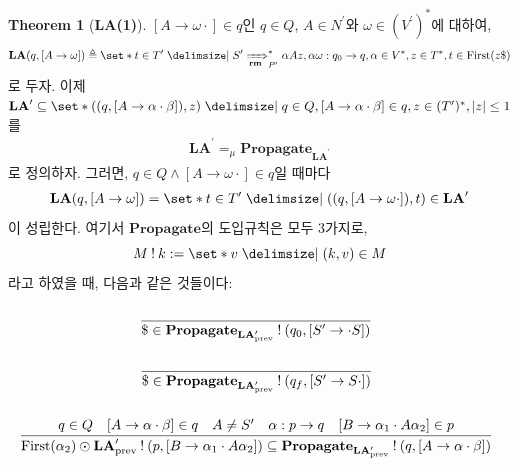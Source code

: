 \documentclass[12pt]{paper}
\theoremstyle{definition}
\newtheorem*{theorem}{Theorem}
\begin{document}
\begin{theorem}[\textbf{LA(1)}]
$ [ A \to \omega \cdot ] \in q $인 $q \in Q$, $A \in N^\prime$와 $\omega \in ( V^\prime )^\ast$에 대하여,
\begin{align}
\mathbf{LA} ( q , [ A \to \omega ] ) \triangleq \set*{ t \in T^\prime \mid S^\prime \xRightarrow[\mathbf{rm}]{}_{P^\prime}^\ast \alpha A z , \alpha \omega : q_0 \to q , \alpha \in V^\ast , z \in T^\ast , t \in \mathrm{First} ( z \$ ) }
\end{align}
로 두자. 이제 $\mathbf{LA}^\prime \subseteq \set*{ ( ( q , [ A \to \alpha \cdot \beta ] ) , z ) \mid q \in Q , [ A \to \alpha \cdot \beta ] \in q , z \in ( T^\prime )^\ast , \left| z \right| \le 1 } $를
\begin{align*}
\mathbf{LA}^\prime =_\mu \textbf{Propagate}_{\mathbf{LA}^\prime}
\end{align*}
로 정의하자.
그러면, $q \in Q \land [ A \to \omega \cdot ] \in q$일 때마다
\begin{align}
\mathbf{LA} ( q , [ A \to \omega ] ) = \set*{ t \in T^\prime \mid ( ( q , [ A \to \omega \cdot ] ) , t ) \in \mathbf{LA}^\prime }
\end{align}
이 성립한다.
여기서 $\textbf{Propagate}$의 도입규칙은 모두 3가지로, $$M \mathbin{!} k := \set*{ v \mid ( k , v ) \in M }$$라고 하였을 때, 다음과 같은 것들이다:
\begin{equation}
\begin{matrix}\\ \infer[]{\$ \in \textbf{Propagate}_{\mathbf{LA}^\prime_\mathrm{prev}} \mathbin{!} ( q_0 , [ S^\prime \to \cdot S ] )}{}\end{matrix}
\end{equation}
\begin{equation}
\begin{matrix}\\ \infer[]{\$ \in \textbf{Propagate}_{\mathbf{LA}^\prime_\mathrm{prev}} \mathbin{!} ( q_f , [ S^\prime \to S \cdot ] )}{}\end{matrix}
\end{equation}
\begin{equation}
\begin{matrix}\\ \infer[]{\mathrm{First} ( \alpha_2 ) \odot \mathbf{LA}^\prime_\mathrm{prev} \mathbin{!} ( p , [ B \to \alpha_1 \cdot A \alpha_2 ] ) \subseteq \textbf{Propagate}_{\mathbf{LA}^\prime_\mathrm{prev}} \mathbin{!} ( q , [ A \to \alpha \cdot \beta ])}{q \in Q & [ A \to \alpha \cdot \beta ] \in q & A \ne S^\prime & \alpha : p \to q & [ B \to \alpha_1 \cdot A \alpha_2] \in p}\end{matrix}
\end{equation}
\end{theorem}
\end{document}
